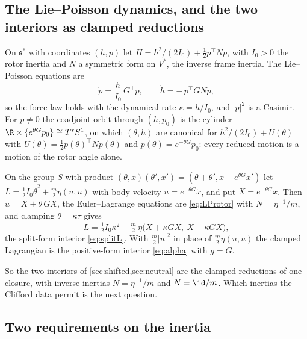 \subsection{The Lie--Poisson dynamics, and the two interiors as clamped reductions}

\begin{proposition}
\label{prop:LP}
On $\mathfrak s^*$ with coordinates $(h,p)$ let $H=h^2/(2I_0)+\tfrac12p^{\!\top}Np$, with $I_0>0$ the rotor inertia and $N$ a symmetric form on
$V^*$, the inverse frame inertia. The Lie--Poisson equations are
\begin{equation}
\label{eq:LProtor}
\dot p=\frac h{I_0}\,G^{\!\top}p,\qquad \dot h=-\,p^{\!\top}GNp ,
\end{equation}
so the force law holds with the dynamical rate $\kappa=h/I_0$, and $|p|^2$ is a Casimir. For $p\neq0$ the coadjoint orbit through $(h,p_0)$ is the
cylinder $\R\times\{e^{\theta G}p_0\}\cong T^*S^1$, on which $(\theta,h)$ are canonical for $h^2/(2I_0)+U(\theta)$ with
$U(\theta)=\tfrac12p(\theta)^{\!\top}Np(\theta)$ and $p(\theta)=e^{-\theta G}p_0$: every reduced motion is a motion of the rotor angle alone.
\end{proposition}

\begin{proposition}
\label{prop:groupred}
On the group $S$ with product $(\theta,x)(\theta',x')=(\theta+\theta',x+e^{\theta G}x')$ let $L=\tfrac12I_0\dot\theta^2+\tfrac m2\eta(u,u)$ with body velocity
$u=e^{-\theta G}\dot x$, and put $X=e^{-\theta G}x$. Then $u=\dot X+\dot\theta\,GX$, the Euler--Lagrange equations are \eqref{eq:LProtor} with $N=\eta^{-1}/m$,
and clamping $\theta=\kappa\tau$ gives
\[
L=\tfrac12I_0\kappa^2+\tfrac m2\,\eta\bigl(\dot X+\kappa GX,\ \dot X+\kappa GX\bigr),
\]
the split-form interior \eqref{eq:splitL}. With $\tfrac m2|u|^2$ in place of $\tfrac m2\eta(u,u)$ the clamped Lagrangian is the positive-form interior
\eqref{eq:alpha} with $g=G$.
\end{proposition}

So the two interiors of \cref{sec:shifted,sec:neutral} are the clamped reductions of one closure, with inverse inertias $N=\eta^{-1}/m$ and
$N=\id/m$. Which inertias the Clifford data permit is the next question.

\subsection{Two requirements on the inertia}

